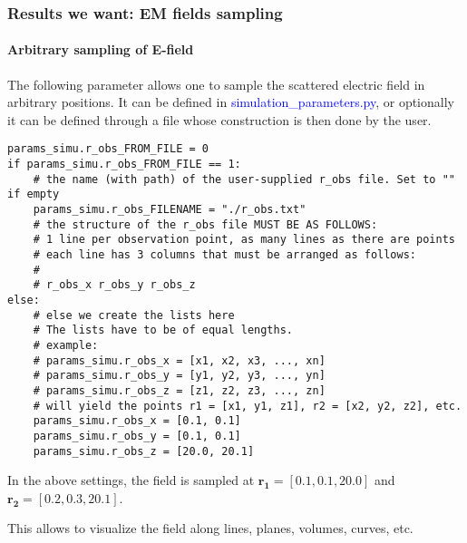 \documentclass[a4paper,10pt]{book}
\newcommand{\file}[1] {\textcolor{blue}{\textsf{#1}}}
\begin{document}
\subsubsection{Results we want: EM fields sampling}

\paragraph{Arbitrary sampling of E-field}
%
\par
The following parameter allows one to sample the scattered electric field in arbitrary positions. It can be defined in \file{simulation\_parameters.py}, or optionally it can be defined through a file whose construction is then done by the user.
\begin{verbatim}
params_simu.r_obs_FROM_FILE = 0
if params_simu.r_obs_FROM_FILE == 1:
    # the name (with path) of the user-supplied r_obs file. Set to "" if empty
    params_simu.r_obs_FILENAME = "./r_obs.txt"
    # the structure of the r_obs file MUST BE AS FOLLOWS:
    # 1 line per observation point, as many lines as there are points
    # each line has 3 columns that must be arranged as follows:
    #
    # r_obs_x r_obs_y r_obs_z
else:
    # else we create the lists here
    # The lists have to be of equal lengths.
    # example:
    # params_simu.r_obs_x = [x1, x2, x3, ..., xn]
    # params_simu.r_obs_y = [y1, y2, y3, ..., yn]
    # params_simu.r_obs_z = [z1, z2, z3, ..., zn]
    # will yield the points r1 = [x1, y1, z1], r2 = [x2, y2, z2], etc.
    params_simu.r_obs_x = [0.1, 0.1]
    params_simu.r_obs_y = [0.1, 0.1]
    params_simu.r_obs_z = [20.0, 20.1]
\end{verbatim}
In the above settings, the field is sampled at $\mathbf{r_1} = [0.1, 0.1, 20.0 ]$ and $\mathbf{r_2} = [0.2, 0.3, 20.1 ]$.
%
\par
This allows to visualize the field along lines, planes, volumes, curves, etc.
\end{document}
